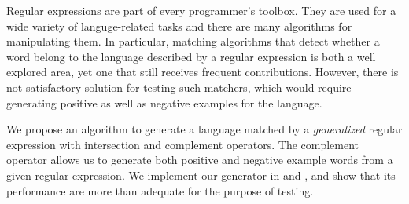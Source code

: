 Regular expressions are part of every programmer's toolbox.  They are
used for a wide variety of languge-related tasks and there are many algorithms for
manipulating them. In particular, matching algorithms that detect
whether a word belong to the language described by a regular
expression is both a well explored area, 
yet one that still receives frequent contributions. However, there is
not satisfactory solution for testing such matchers, which would
require generating positive as well as negative examples for the language. 

We propose an algorithm to generate a language matched by a \emph{generalized}
regular expression with intersection and complement operators.
The complement operator allows us to generate both positive and
negative example words
from a given regular expression.
We implement our generator in \haskell and \ocaml,
and show that its performance are more than
adequate for the purpose of testing.

